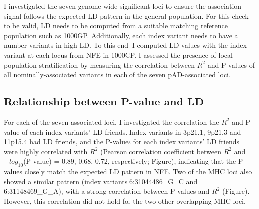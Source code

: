     I investigated the seven genome-wide significant loci to ensure the association signal follows the expected LD pattern in the general population. For this check to be valid, LD needs to be computed from a suitable matching reference population such as 1000GP. Additionally, each index variant needs to have a number variants in high LD. To this end, I computed LD values with the index variant at each locus from NFE in 1000GP. I assessed the presence of local population stratification by measuring the correlation between $R^{2}$ and P-values of all nominally-associated variants in each of the seven pAD-associated loci.\\

    
    
    \subsection{Relationship between P-value and LD}
  For each of the seven associated loci, I investigated the correlation the $R^{2}$ and P-value of each index variants' LD friends. Index variants in 3p21.1, 9p21.3 and 11p15.4 had LD friends, and the P-values for each index variants' LD friends were highly correlated with $R^{2}$ (Pearson correlation coefficient between $R^{2}$ and $-log_{10}$(P-value) = 0.89, 0.68, 0.72, respectively; Figure), indicating that the P-values closely match the expected LD pattern in
  NFE. Two of the MHC loci also showed a similar pattern (index variants 6:31044486\_G\_C and 6:31148469\_G\_A), with a strong correlation between P-values and $R^{2}$ (Figure). However, this correlation did not hold for the two other overlapping MHC loci.
  
